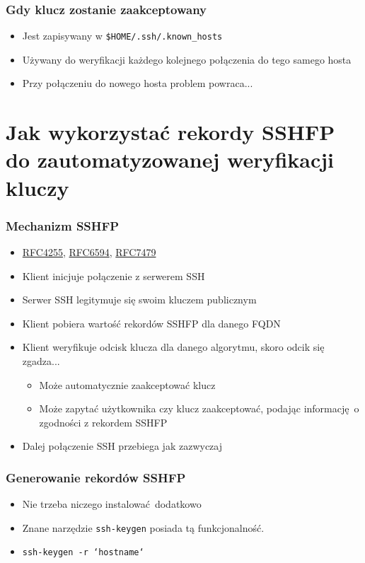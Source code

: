 \documentclass[dvipsnames,table]{beamer}
\begin{document}
\begin{frame}
\frametitle{Gdy klucz zostanie zaakceptowany}
\begin{itemize}
	\item Jest zapisywany w {\tt \$HOME/.ssh/.known\_hosts}
	\item Używany do weryfikacji każdego kolejnego połączenia do tego samego hosta
	\item Przy połączeniu do nowego hosta problem powraca...
\end{itemize}
\end{frame}

\section{Jak wykorzystać rekordy SSHFP do zautomatyzowanej weryfikacji kluczy}

\begin{frame}
\frametitle{Mechanizm SSHFP}
\begin{itemize}
	\item \href{https://tools.ietf.org/html/rfc4255}{RFC4255},
		  \href{https://tools.ietf.org/html/rfc6594}{RFC6594},
		  \href{https://tools.ietf.org/html/rfc7479}{RFC7479}
	\item Klient inicjuje połączenie z serwerem SSH
	\item Serwer SSH legitymuje się swoim kluczem publicznym
	\item Klient pobiera wartość rekordów SSHFP dla danego FQDN
	\item Klient weryfikuje odcisk klucza dla danego algorytmu, skoro odcik się zgadza...
	\begin{itemize}
		\item Może automatycznie zaakceptować klucz
		\item Może zapytać użytkownika czy klucz zaakceptować, podając informację o zgodności z rekordem SSHFP
	\end{itemize}
	\item Dalej połączenie SSH przebiega jak zazwyczaj
\end{itemize}
\end{frame}

\begin{frame}
\frametitle{Generowanie rekordów SSHFP}
\begin{itemize}
	\item Nie trzeba niczego instalować dodatkowo \Smiley
	\item Znane narzędzie {\tt ssh-keygen} posiada tą funkcjonalność.
	\item {\tt ssh-keygen -r `hostname`}
\end{itemize}
\end{frame}
\end{document}
